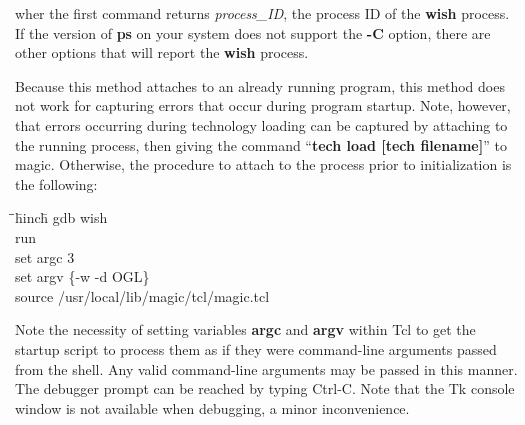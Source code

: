 \documentclass[letterpaper,twoside,12pt]{article}
\def\hinch{\hspace*{0.5in}}
\def\starti{\begin{center}\begin{tabbing}\hinch\=\hinch\=
	\hinch\=hinch\hinch\=\kill}
\def\endi{\end{tabbing}\end{center}}
\def\ii{\>\>\>}
\begin{document}
wher the first command returns {\itshape process\_ID}, the  process ID of
the {\bfseries wish} process.  If the
version of {\bfseries ps} on your system does not support the {\bfseries
-C} option, there are other options that will report the {\bfseries wish}
process.

Because this method attaches to an already running program, this method
does not work for capturing errors that occur during program startup.
Note, however, that errors occurring during technology loading can be
captured by attaching to the running process, then giving the command
``{\bfseries tech load [tech filename]}'' to magic.  Otherwise, the
procedure to attach to the process prior to initialization is the
following:

\starti
  \ii gdb wish \\
  \ii run \\
  \ii set argc 3 \\
  \ii set argv \{-w -d OGL\} \\
  \ii source /usr/local/lib/magic/tcl/magic.tcl
\endi

Note the necessity of setting variables {\bfseries argc} and {\bfseries
argv} within Tcl to get the startup script to process them as if they
were command-line arguments passed from the shell.  Any valid command-line
arguments may be passed in this manner.  The debugger prompt can be reached
by typing Ctrl-C.  Note that the Tk console window is not available when
debugging, a minor inconvenience.
\end{document}
